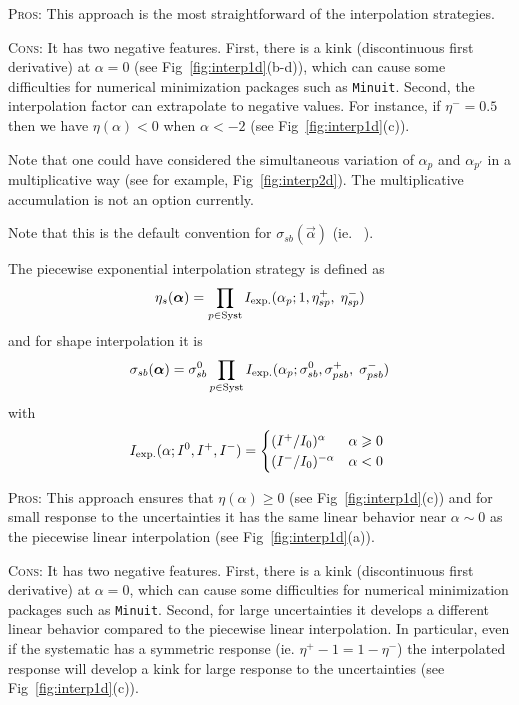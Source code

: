 \textsc{Pros:} This approach is the most straightforward of the interpolation strategies.

\textsc{Cons:} It has two negative features.  First, there is a kink (discontinuous first derivative) at $\alpha=0$ (see Fig~\ref{fig:interp1d}(b-d)), which can cause some difficulties for numerical minimization packages such as \texttt{Minuit}.  Second, the interpolation factor can extrapolate to negative values.  For instance, if $\eta^-=0.5$ then  we have $\eta(\alpha)<0$  when $\alpha<-2$  (see Fig~\ref{fig:interp1d}(c)).  

Note that one could have considered the simultaneous variation of $\alpha_{p}$ and $\alpha_{p'}$ in a multiplicative way (see for example, Fig~\ref{fig:interp2d}).  The multiplicative accumulation is not an option currently.

Note that this is the default convention for $\sigma_{sb}(\vec{\alpha})$ (ie. \HS\ ).


The piecewise exponential interpolation strategy is defined as
\begin{equation}
\eta_s ({\boldsymbol \alpha}) = \prod_{p\in\textrm{Syst}} I_{\rm exp.}(\alpha_p; 1,\eta_{sp}^+, \; \eta_{sp}^- ) 
\end{equation}
and for shape interpolation it is
\begin{equation}
\sigma_{sb} ({\boldsymbol \alpha}) = \sigma_{sb}^0 \prod_{p\in\textrm{Syst}} I_{\rm exp.}(\alpha_p;  \sigma_{sb}^0, \sigma_{psb}^+ ,\;
\sigma_{psb}^- )  
\end{equation}
with
\begin{equation}
 I_{\rm exp.}(\alpha;  I^0, I^+,I^- ) =
 \begin{cases}
     (I^+/I_0)^ \alpha  &  \text{$\alpha\ge 0$} \\
     (I^-/I_0)^{-\alpha}  &  \text{$\alpha<0$ }
 \end{cases}
\end{equation}

\textsc{Pros:} This approach ensures that $\eta(\alpha)\ge 0$ (see Fig~\ref{fig:interp1d}(c)) and for small response to the uncertainties it has the same linear behavior near $\alpha\sim 0$ as the piecewise linear interpolation (see Fig~\ref{fig:interp1d}(a)).

\textsc{Cons:} It has two negative features.  First, there is a kink (discontinuous first derivative) at $\alpha=0$, which can cause some difficulties for numerical minimization packages such as \texttt{Minuit}.  Second, for large uncertainties it develops a different linear behavior compared to the piecewise linear interpolation.  In particular, even if the systematic has a symmetric response (ie. $\eta^+-1 = 1-\eta^-$) the interpolated response will develop a kink for large response to the uncertainties  (see Fig~\ref{fig:interp1d}(c)).

